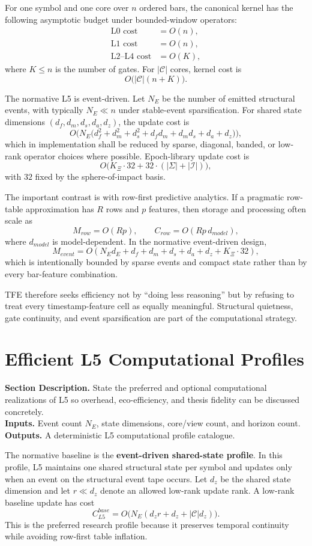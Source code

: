 \documentclass[11pt]{report}
\newcommand{\meta}[3]{\textbf{Section Description.} #1\\
\textbf{Inputs.} #2\\
\textbf{Outputs.} #3\par}
\begin{document}
For one symbol and one core over $n$ ordered bars, the canonical kernel has the following asymptotic budget under bounded-window operators:
\begin{align*}
\text{L0 cost} &= O(n),\\
\text{L1 cost} &= O(n),\\
\text{L2--L4 cost} &= O(K),
\end{align*}
where $K\le n$ is the number of gates. For $|\mathcal{C}|$ cores, kernel cost is
\[
O\big(|\mathcal{C}|(n+K)\big).
\]

The normative L5 is event-driven. Let $N_E$ be the number of emitted structural events, with typically $N_E\ll n$ under stable-event sparsification. For shared state dimensions $(d_f,d_m,d_s,d_a,d_z)$, the update cost is
\[
O\Big(N_E\big(d_f^2+d_m^2+d_s^2+d_f d_m+d_m d_s+d_a+d_z\big)\Big),
\]
which in implementation shall be reduced by sparse, diagonal, banded, or low-rank operator choices where possible. Epoch-library update cost is
\[
O\big(K_{\Xi}\cdot 32 + 32\cdot(|\Sigma|+|\mathcal{I}|)\big),
\]
with $32$ fixed by the sphere-of-impact basis.

The important contrast is with row-first predictive analytics. If a pragmatic row-table approximation has $R$ rows and $p$ features, then storage and processing often scale as
\[
M_{row}=O(Rp),\qquad C_{row}=O(Rp\,d_{model}),
\]
where $d_{model}$ is model-dependent. In the normative event-driven design,
\[
M_{event}=O(N_E d_E + d_f+d_m+d_s+d_a+d_z + K_{\Xi}\cdot 32),
\]
which is intentionally bounded by sparse events and compact state rather than by every bar-feature combination.

TFE therefore seeks efficiency not by ``doing less reasoning'' but by refusing to treat every timestamp-feature cell as equally meaningful. Structural quietness, gate continuity, and event sparsification are part of the computational strategy.

\section{Efficient L5 Computational Profiles}
\meta{State the preferred and optional computational realizations of L5 so overhead, eco-efficiency, and thesis fidelity can be discussed concretely.}{Event count $N_E$, state dimensions, core/view count, and horizon count.}{A deterministic L5 computational profile catalogue.}

The normative baseline is the \textbf{event-driven shared-state profile}. In this profile, L5 maintains one shared structural state per symbol and updates only when an event on the structural event tape occurs. Let $d_z$ be the shared state dimension and let $r\ll d_z$ denote an allowed low-rank update rank. A low-rank baseline update has cost
\[
C_{L5}^{base}=O\big(N_E(d_z r + d_z + |\mathcal{C}|d_z)\big).
\]
This is the preferred research profile because it preserves temporal continuity while avoiding row-first table inflation.
\end{document}
